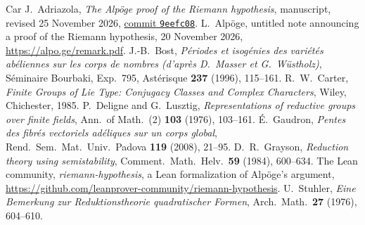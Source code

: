 \documentclass[reqno]{amsart}
\theoremstyle{definition}
\theoremstyle{plain}
\begin{document}
\begin{thebibliography}{Car}
 J.~Adriazola, \emph{The Alp\"oge proof of the Riemann hypothesis}, manuscript, revised 25 November 2026, \href{https://github.com/jimjamzola/RH-Alpoge-Reconstruction/tree/9eefc08b0819728d4dd2ef0568b49a61251af111}{commit \texttt{9eefc08}}.
 L.~Alp\"oge, untitled note announcing a proof of the Riemann hypothesis, 20 November 2026, \url{https://alpo.ge/remark.pdf}.
 J.-B.~Bost, \emph{P\'eriodes et isog\'enies des vari\'et\'es ab\'eliennes sur les corps de nombres (d'apr\`es D.~Masser et G.~W\"ustholz)}, S\'eminaire Bourbaki, Exp.~795, Ast\'erisque \textbf{237} (1996), 115--161.
 R.~W.~Carter, \emph{Finite Groups of Lie Type: Conjugacy Classes and Complex Characters}, Wiley, Chichester, 1985.
 P.~Deligne and G.~Lusztig, \emph{Representations of reductive groups over finite fields}, Ann.\ of Math.\ (2) \textbf{103} (1976), 103--161.
 \'E.~Gaudron, \emph{Pentes des fibr\'es vectoriels ad\'eliques sur un corps global}, Rend.\ Sem.\ Mat.\ Univ.\ Padova \textbf{119} (2008), 21--95.
 D.~R.~Grayson, \emph{Reduction theory using semistability}, Comment.\ Math.\ Helv.\ \textbf{59} (1984), 600--634.
 The Lean community, \emph{riemann-hypothesis}, a Lean formalization of Alp\"oge's argument, \url{https://github.com/leanprover-community/riemann-hypothesis}.
 U.~Stuhler, \emph{Eine Bemerkung zur Reduktionstheorie quadratischer Formen}, Arch.\ Math.\ \textbf{27} (1976), 604--610.
\end{thebibliography}
\end{document}
